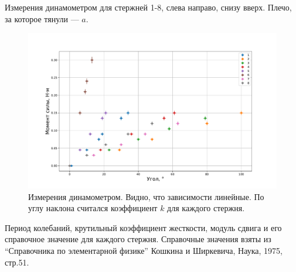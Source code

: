 \documentclass[a4paper, 12pt]{article}
\begin{document}
\begin{table}[!htbp]
\label{tab:force-angle}
\caption{
    Измерения динамометром для стержней 1-8, слева направо, снизу вверх.
    Плечо, за которое тянули --- $a$.
}








\end{table}

\begin{figure}[h]
\label{fig:torque-angle-plot}
\caption{
    Измерения динамометром. Видно, что зависимости линейные.
    По углу наклона считался коэффициент $k$ для каждого стержня.
}
\begin{center}
\includegraphics[width=1\linewidth]{torque-angle-plot.pdf}
\end{center}
\end{figure}

\begin{table}[!htbp]
\label{tab:main}
\caption{
    Период колебаний, крутильный коэффициент жесткости,
    модуль сдвига и его справочное значение для каждого стержня.
    Справочные значения взяты из ``Справочника по элементарной физике''
    Кошкина и Ширкевича, Наука, 1975, стр.51.
}

\end{table}
\end{document}
